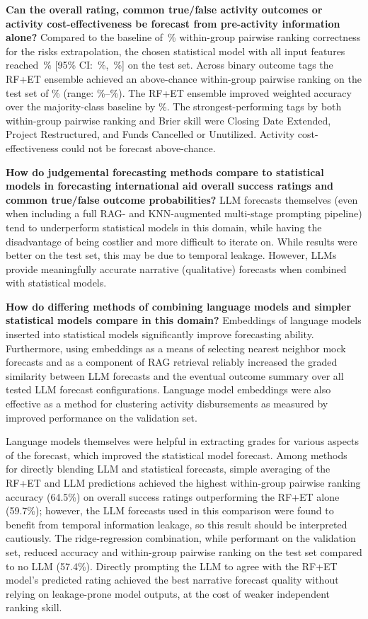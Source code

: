 \documentclass[12pt,a4paper]{article}
\begin{document}
\textbf{Can the overall rating, common true/false activity outcomes or activity cost-effectiveness be forecast from pre-activity information alone?}
Compared to the baseline of \PairwiseHuman\,\% within-group pairwise ranking correctness for the risks extrapolation, the chosen statistical model with all input features reached \PairwiseModel\,\% [95\% CI: \PairwiseCILow\,\%, \PairwiseCIHigh\,\%] on the test set. Across \NumCuratedPredicted{} binary outcome tags the RF+ET ensemble achieved an above-chance within-group pairwise ranking on the test set of \OutcomeTagPairwiseAvg\% (range: \OutcomeTagPairwiseMin\%--\OutcomeTagPairwiseMax\%). The RF+ET ensemble improved weighted accuracy over the majority-class baseline by \OutcomeTagAccImprovement\%. The strongest-performing tags by both within-group pairwise ranking and Brier skill were Closing Date Extended, Project Restructured, and Funds Cancelled or Unutilized. Activity cost-effectiveness could not be forecast above-chance.

\textbf{How do judgemental forecasting methods compare to statistical models in forecasting international aid overall success ratings and common true/false outcome probabilities?}
LLM forecasts themselves (even when including a full RAG- and KNN-augmented multi-stage prompting pipeline) tend to underperform statistical models in this domain, while having the disadvantage of being costlier and more difficult to iterate on. While results were better on the test set, this may be due to temporal leakage. However, LLMs provide meaningfully accurate narrative (qualitative) forecasts when combined with statistical models.


\textbf{How do differing methods of combining language models and simpler statistical models compare in this domain?}
Embeddings of language models inserted into statistical models significantly improve forecasting ability. Furthermore, using embeddings as a means of selecting nearest neighbor mock forecasts and as a component of RAG retrieval reliably increased the graded similarity between LLM forecasts and the eventual outcome summary over all tested LLM forecast configurations. Language model embeddings were also effective as a method for clustering activity disbursements as measured by improved performance on the validation set.

Language models themselves were helpful in extracting grades for various aspects of the forecast, which improved the statistical model forecast. Among methods for directly blending LLM and statistical forecasts, simple averaging of the RF+ET and LLM predictions achieved the highest within-group pairwise ranking accuracy (64.5\%) on overall success ratings outperforming the RF+ET alone (59.7\%); however, the LLM forecasts used in this comparison were found to benefit from temporal information leakage, so this result should be interpreted cautiously. The ridge-regression combination, while performant on the validation set, reduced accuracy and within-group pairwise ranking on the test set compared to no LLM (57.4\%). Directly prompting the LLM to agree with the RF+ET model's predicted rating achieved the best narrative forecast quality without relying on leakage-prone model outputs, at the cost of weaker independent ranking skill.
\end{document}
